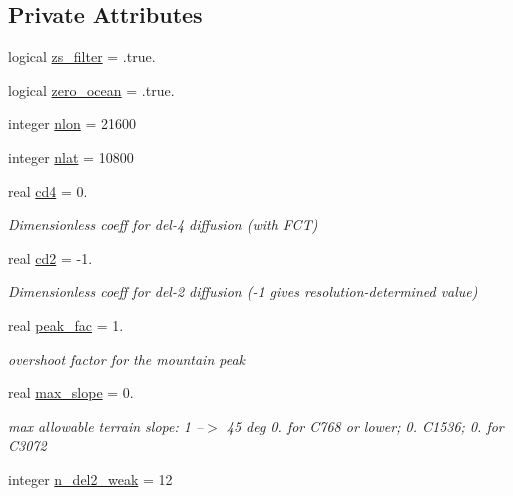 \subsection*{Private Attributes}
\begin{DoxyCompactItemize}
\item 
logical \hyperlink{classfv__surf__map__mod_a536f543b0d6bb2e2fbb3d98468ef8094}{zs\-\_\-filter} = .true.
\item 
logical \hyperlink{classfv__surf__map__mod_a08c3188d0168e655ed23ece6b7a57043}{zero\-\_\-ocean} = .true.
\item 
integer \hyperlink{classfv__surf__map__mod_a72b1ec87d6827bd07191488811b6f129}{nlon} = 21600
\item 
integer \hyperlink{classfv__surf__map__mod_a7fdae69a68724b43026ac21d8a40a60f}{nlat} = 10800
\item 
real \hyperlink{classfv__surf__map__mod_a533dee578c658a1a4e6533b71d4c89bc}{cd4} = 0.
\begin{DoxyCompactList}\small\item\em Dimensionless coeff for del-\/4 diffusion (with F\-C\-T) \end{DoxyCompactList}\item 
real \hyperlink{classfv__surf__map__mod_a3d2c1c7379279eca4f6e6d78b7e8c30d}{cd2} = -\/1.
\begin{DoxyCompactList}\small\item\em Dimensionless coeff for del-\/2 diffusion (-\/1 gives resolution-\/determined value) \end{DoxyCompactList}\item 
real \hyperlink{classfv__surf__map__mod_a66780e7d69cb8f5776ae7e79b7301e92}{peak\-\_\-fac} = 1.
\begin{DoxyCompactList}\small\item\em overshoot factor for the mountain peak \end{DoxyCompactList}\item 
real \hyperlink{classfv__surf__map__mod_a3848f9f737582dc4b286eb1e748b7c29}{max\-\_\-slope} = 0.
\begin{DoxyCompactList}\small\item\em max allowable terrain slope\-: 1 --$>$ 45 deg 0. for C768 or lower; 0. C1536; 0. for C3072 \end{DoxyCompactList}\item 
integer \hyperlink{classfv__surf__map__mod_a2f02a11eec518babdafb7c9a49d3cb9b}{n\-\_\-del2\-\_\-weak} = 12
\item 

\end{DoxyCompactItemize}
